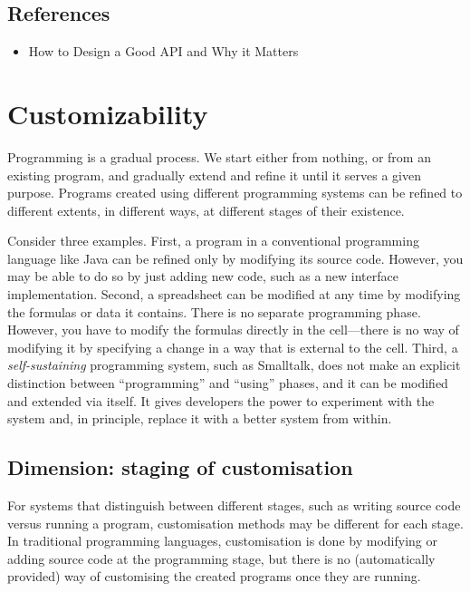 \documentclass[ twoside,openright,titlepage,numbers=noenddot,headinclude,footinclude,cleardoublepage=empty,abstract=on,
                BCOR=5mm,paper=a4,fontsize=11pt
                ]{scrreprt}
\providecommand{\tightlist}{}\newenvironment{longtable}[2]{\begin{tabular}}{\end{tabular}}
\theoremstyle{definition}
\begin{document}
\hypertarget{references-1}{\subsection{References}\label{references-1}}

\begin{itemize}
\tightlist
\item
  How to Design a Good API and Why it Matters \parencite{APIdesign}
\end{itemize}

\hypertarget{customizability}{\section{Customizability}\label{customizability}}


Programming is a gradual process. We start either from nothing, or from
an existing program, and gradually extend and refine it until it serves
a given purpose. Programs created using different programming systems
can be refined to different extents, in different ways, at different
stages of their existence.

Consider three examples. First, a program in a conventional programming
language like Java can be refined only by modifying its source code.
However, you may be able to do so by just adding new code, such as a new
interface implementation. Second, a spreadsheet can be modified at any
time by modifying the formulas or data it contains. There is no separate
programming phase. However, you have to modify the formulas directly in
the cell---there is no way of modifying it by specifying a change in a
way that is external to the cell. Third, a \emph{self-sustaining}
programming system, such as Smalltalk, does not make an explicit
distinction between ``programming'' and ``using'' phases, and it can be
modified and extended via itself. It gives developers the power to
experiment with the system and, in principle, replace it with a better
system from within.

\hypertarget{dimension-staging-of-customisation}{\subsection{Dimension: staging of
customisation}\label{dimension-staging-of-customisation}}

For systems that distinguish between different stages, such as writing
source code versus running a program, customisation methods may be
different for each stage. In traditional programming languages,
customisation is done by modifying or adding source code at the
programming stage, but there is no (automatically provided) way of
customising the created programs once they are running.
\end{document}
